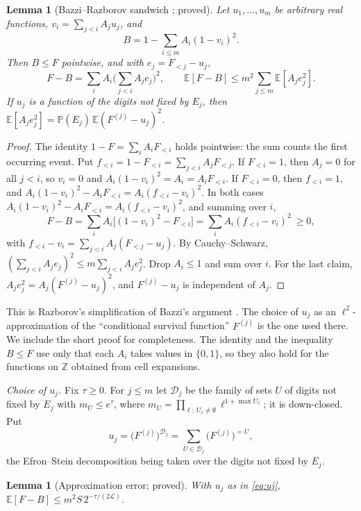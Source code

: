 \documentclass[11pt,reqno]{amsart}
\newtheorem{lemma}[theorem]{Lemma}
\theoremstyle{definition}
\newcommand{\Lc}{\mathcal L}
\newcommand{\E}{\mathbb E}
\newcommand{\PP}{\mathbb P}
\newcommand{\cD}{\mathcal D}
\begin{document}
\begin{lemma}[Bazzi--Razborov sandwich {\cite{Bazzi,Razborov}}; proved]\label{lem:brw}
Let $u_1,\dots,u_m$ be arbitrary real functions, $v_i=\sum_{j<i}A_ju_j$, and
\[
 B=1-\sum_{i\le m}A_i(1-v_i)^2 .
\]
Then $B\le F$ pointwise, and with $e_j=F_{<j}-u_j$,
\[
 F-B=\sum_iA_i\Big(\sum_{j<i}A_je_j\Big)^2,\qquad \E[F-B]\le m^2\sum_{j\le m}\E[A_je_j^2].
\]
If $u_j$ is a function of the digits not fixed by $E_j$, then
$\E[A_je_j^2]=\PP(E_j)\,\E(F^{(j)}-u_j)^2$.
\end{lemma}

\begin{proof}
The identity $1-F=\sum_iA_iF_{<i}$ holds pointwise: the sum counts the first
occurring event.  Put $f_{<i}=1-F_{<i}=\sum_{j<i}A_jF_{<j}$.  If $F_{<i}=1$,
then $A_j=0$ for all $j<i$, so $v_i=0$ and $A_i(1-v_i)^2=A_i=A_iF_{<i}$.  If
$F_{<i}=0$, then $f_{<i}=1$, and $A_i(1-v_i)^2-A_iF_{<i}=A_i(f_{<i}-v_i)^2$.  In
both cases $A_i(1-v_i)^2-A_iF_{<i}=A_i(f_{<i}-v_i)^2$, and summing over $i$,
\[
 F-B=\sum_iA_i\big[(1-v_i)^2-F_{<i}\big]=\sum_iA_i(f_{<i}-v_i)^2\ \ge0,
\]
with $f_{<i}-v_i=\sum_{j<i}A_j(F_{<j}-u_j)$.  By Cauchy--Schwarz,
$(\sum_{j<i}A_je_j)^2\le m\sum_{j<i}A_je_j^2$.  Drop $A_i\le1$ and sum over
$i$.  For the last claim, $A_je_j^2=A_j(F^{(j)}-u_j)^2$, and $F^{(j)}-u_j$ is
independent of $A_j$.
\end{proof}

This is Razborov's simplification \cite{Razborov} of Bazzi's argument
\cite{Bazzi}.  The choice of $u_j$ as an $\ell^2$-approximation of the
``conditional survival function'' $F^{(j)}$ is the one used there.  We
include the short proof for completeness.  The identity and the inequality
$B\le F$ use only that each $A_i$ takes values in $\{0,1\}$, so they also hold
for the functions on $\mathbb Z$ obtained from cell expansions.

\emph{Choice of $u_j$.}  Fix $\tau\ge0$.  For $j\le m$ let $\cD_j$ be the family of
sets $U$ of digits not fixed by $E_j$ with $m_U\le e^\tau$, where
$m_U=\prod_{\ell:\,U_\ell\ne\emptyset}\ell^{1+\max U_\ell}$; it is down-closed.  Put
\begin{equation}\label{eq:uj}
 u_j=\big(F^{(j)}\big)^{\cD_j}=\sum_{U\in\cD_j}\big(F^{(j)}\big)^{=U},
\end{equation}
the Efron--Stein decomposition being taken over the digits not fixed by $E_j$.

\begin{lemma}[Approximation error; proved]\label{lem:EL}
With $u_j$ as in \eqref{eq:uj}, $\E[F-B]\le m^2S\,2^{-\tau/(2\Lc)}$.
\end{lemma}
\end{document}
